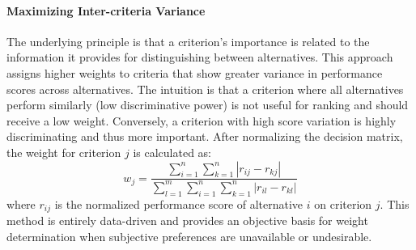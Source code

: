\paragraph{Maximizing Inter-criteria Variance}
The underlying principle is that a criterion's importance is related to the information it provides for distinguishing between alternatives. This approach assigns higher weights to criteria that show greater variance in performance scores across alternatives. The intuition is that a criterion where all alternatives perform similarly (low discriminative power) is not useful for ranking and should receive a low weight. Conversely, a criterion with high score variation is highly discriminating and thus more important. After normalizing the decision matrix, the weight for criterion $j$ is calculated as:
\begin{equation}
    w_j = \frac{\sum_{i=1}^{n} \sum_{k=1}^{n} |r_{ij} - r_{kj}|}{\sum_{l=1}^{m} \sum_{i=1}^{n} \sum_{k=1}^{n} |r_{il} - r_{kl}|}
\end{equation}
where $r_{ij}$ is the normalized performance score of alternative $i$ on criterion $j$. This method is entirely data-driven and provides an objective basis for weight determination when subjective preferences are unavailable or undesirable.